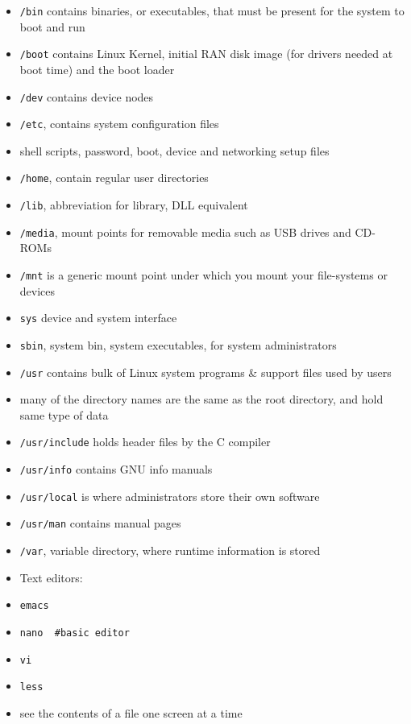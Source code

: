 \documentclass[twocolumn]{IEEEtran} %
\begin{document}
\begin{itemize}
        \item \verb|/bin| contains binaries, or executables, that must be present for the system to boot and run
        \item \verb|/boot| contains Linux Kernel, initial RAN disk image (for drivers needed at boot time) and the boot loader
        \item \verb|/dev| contains device nodes
        \item \verb|/etc|, contains system configuration files
        \bi
            \item shell scripts, password, boot, device and networking setup files
        \ei
        \item \verb|/home|, contain regular user directories
        \item \verb|/lib|, abbreviation for library, DLL equivalent
        \item \verb|/media|, mount points for removable media such as USB drives and CD-ROMs
        \item \verb|/mnt| is a generic mount point under which you mount your file-systems or devices
        \item \verb|sys| device and system interface
        \item \verb|sbin|, system bin, system executables, for system administrators
        \item \verb|/usr| contains bulk of Linux system programs \& support files used by users
        \bi
            \item many of the directory names are the same as the root directory, and hold same type of data
            \item \verb|/usr/include| holds header files by the C compiler
            \item \verb|/usr/info| contains GNU info manuals
            \item \verb|/usr/local| is where administrators store their own software
            \item \verb|/usr/man| contains manual pages
        \ei
        \item \verb|/var|, variable directory, where runtime information is stored
    \ei
    \item Text editors:
    \bi
        \item \verb|emacs|
        \item \verb|nano  #basic editor|
        \item \verb|vi|
        \item \verb|less|
        \bi
            \item see the contents of a file one screen at a time

\end{itemize}
\end{document}
